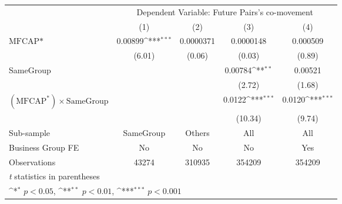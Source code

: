 {
\def\sym#1{\ifmmode^{#1}\else\(^{#1}\)\fi}
\begin{tabular}{l*{4}{c}}
\hline\hline
                &\multicolumn{4}{c}{Dependent Variable:  Future Pairs's co-movement}        \\\cmidrule(lr){2-5}
                &\multicolumn{1}{c}{(1)}         &\multicolumn{1}{c}{(2)}         &\multicolumn{1}{c}{(3)}         &\multicolumn{1}{c}{(4)}         \\
\hline
$ \text{MFCAP*} $&  0.00899\sym{***}&0.0000371         &0.0000148         & 0.000509         \\
                &   (6.01)         &   (0.06)         &   (0.03)         &   (0.89)         \\
[1em]
SameGroup       &                  &                  &  0.00784\sym{**} &  0.00521         \\
                &                  &                  &   (2.72)         &   (1.68)         \\
[1em]
 $ (\text{MFCAP}^*) \times {\text{SameGroup} }  $ &                  &                  &   0.0122\sym{***}&   0.0120\sym{***}\\
                &                  &                  &  (10.34)         &   (9.74)         \\
\hline
Sub-sample      &SameGroup         &   Others         &      All         &      All         \\
Business Group FE&       No         &       No         &       No         &      Yes         \\
Observations    &    43274         &   310935         &   354209         &   354209         \\
\hline\hline
\multicolumn{5}{l}{\footnotesize \textit{t} statistics in parentheses}\\
\multicolumn{5}{l}{\footnotesize \sym{*} \(p<0.05\), \sym{**} \(p<0.01\), \sym{***} \(p<0.001\)}\\
\end{tabular}
}
